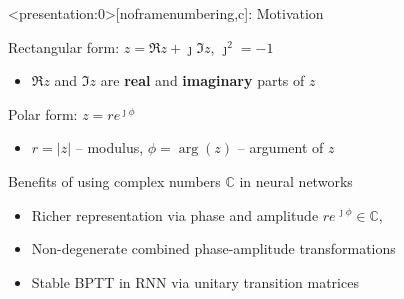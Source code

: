 \documentclass[handout]{beamer}
\newcommand{\cplx}{\mathbb{C}}
\newcommand{\iu}{{\jmath}}
\begin{document}
\begin{frame}<presentation:0>[noframenumbering,c]{\insertsection: Motivation}

  Rectangular form: $z = \Re{z} + \iu \Im{z}$, $\iu^2 = -1$
  \begin{itemize}
    \item $\Re{z}$ and $\Im{z}$ are \textbf{real} and \textbf{imaginary} parts of $z$
  \end{itemize}

  \smallskip
  Polar form: $z = r e^{\iu \phi}$
  \begin{itemize}
    \item $r = \lvert z \rvert$ -- modulus, $\phi = \arg{\!(z)}$ -- argument of $z$
  \end{itemize}

  \bigskip
  Benefits of using complex numbers $\cplx$ in neural networks
  \begin{itemize}
    \item Richer representation via phase and amplitude\textsuperscript{
        \citep{reichert_neuronal_2014}}
      $
        r e^{\,\iu \phi} \in \cplx
      $,

    \smallskip
    \item Non-degenerate combined phase-amplitude
        transformations\textsuperscript{\citep{hirose_generalization_2012}}

    \smallskip
    \item Stable BPTT in RNN via unitary transition
        matrices\textsuperscript{
          \citep{arjovsky_unitary_2016,wisdom_full-capacity_2016}}
  \end{itemize}

\end{frame}
\end{document}
